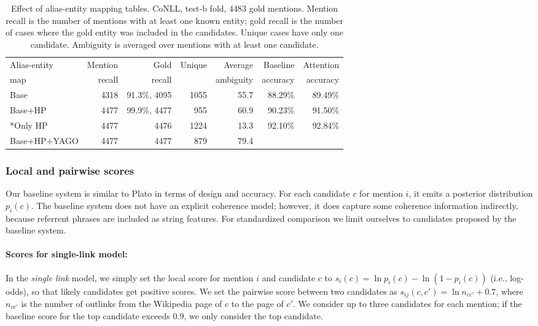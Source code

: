 \begin{table*}
  \centering
  \begin{tabular}{l|r|r|r|r|r|r}
    Alias-entity & Mention &   Gold & Unique & Average   & Baseline & Attention \\
    map          & recall  & recall &        & ambiguity & accuracy & accuracy \\
    \hline
    Base     & 4318 & 91.3\%, 4095 & 1055   & 55.7      & 88.29\%   & 89.49\%  \\
    Base+HP  & 4477 & 99.9\%, 4477 & 955    & 60.9      & 90.23\%   & 91.50\%  \\
    *Only HP & 4477 & 4476   & 1224   & 13.3      & 92.10\%   & 92.84\%  \\
    Base+HP+YAGO & 4477    & 4477   & 879    & 79.4      &          &           
  \end{tabular}
  \caption{Effect of alias-entity mapping tables.  CoNLL, test-b
    fold, 4483 gold mentions.  Mention recall is the number of
    mentions with at least one known entity; gold recall is the number
    of cases where the gold entity was included in the candidates.
    Unique cases have only one candidate.  Ambiguity is averaged over
    mentions with at least one candidate.}
  \label{tab:AliasTable}
\end{table*}





\subsubsection{Local and pairwise scores}
\label{sec:expt:features}

Our baseline system is similar to Plato \cite{Lazic2015} in terms of
design and accuracy.  For each candidate $c$ for mention $i$, it emits
a posterior distribution $p_i(c)$.  The baseline system does not have
an explicit coherence model; however, it does capture some coherence
information indirectly, because referrent phrases are included as
string features.  For standardized comparison we limit ourselves to
candidates proposed by the baseline system.

\paragraph*{Scores for single-link model:}
In the \emph{single link} model, we simply set the local score for
mention $i$ and candidate $c$ to $s_i(c) = \ln p_i(c) - \ln (1 -
p_i(c))$ (i.e., log-odds), so that likely candidates get positive
scores.  We set the pairwise score between two candidates as
$s_{ij}(c, c') = \ln n_{cc'} + 0.7$, where $n_{cc'}$ is the number of
outlinks from the Wikipedia page of $c$ to the page of $c'$.  We
consider up to three candidates for each mention; if the baseline
score for the top candidate exceeds $0.9$, we only consider the top
candidate.


